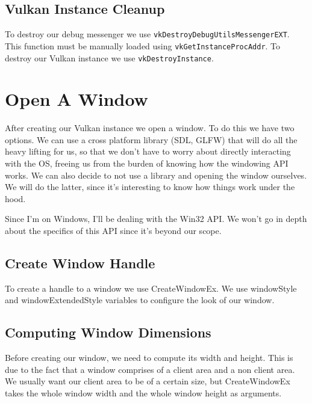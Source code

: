 \subsection{Vulkan Instance Cleanup}

To destroy our debug messenger we use \texttt{vkDestroyDebugUtilsMessengerEXT}.
This function must be manually loaded using \texttt{vkGetInstanceProcAddr}.
To destroy our Vulkan instance we use \texttt{vkDestroyInstance}.

\section{Open A Window}

After creating our Vulkan instance we open a window.
To do this we have two options.
We can use a cross platform library (SDL, GLFW) that will do all the heavy lifting
for us, so that we don't have to worry about directly interacting with the OS,
freeing us from the burden of knowing how the windowing API works.
We can also decide to not use a library and opening the window ourselves.
We will do the latter, since it's interesting to know how things work under the hood.

Since I'm on Windows, I'll be dealing with the Win32 API.
We won't go in depth about the specifics of this API since it's beyond our scope.

\subsection{Create Window Handle}

To create a handle to a window we use CreateWindowEx.
We use windowStyle and windowExtendedStyle variables to configure the look of
our window.

\begin{minipage}{\linewidth}{\noindent}
    
\end{minipage}

\subsection{Computing Window Dimensions}

Before creating our window, we need to compute its width and height.
This is due to the fact that a window comprises of a client area and a non client area.
We usually want our client area to be of a certain size, but CreateWindowEx takes
the whole window width and the whole window height as arguments.

